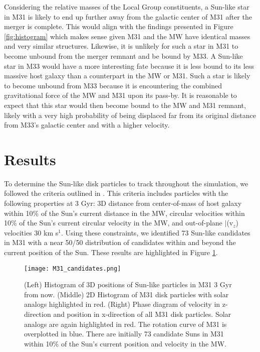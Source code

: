 \documentclass{aastex63}
\begin{document}
Considering the relative masses of the Local Group constituents, a Sun-like star in M31 is likely to end up further away from the galactic center of M31 after the merger is complete. This would align with the findings presented in Figure \ref{fig:histogram} which makes sense given M31 and the MW have identical masses and very similar structures. Likewise, it is unlikely for such a star in M31 to become unbound from the merger remnant and be bound by M33. A Sun-like star in M33 would have a more interesting fate because it is less bound to its less massive host galaxy than a counterpart in the MW or M31. Such a star is likely to become unbound from M33 because it is encountering the combined gravitational force of the MW and M31 upon its pass-by. It is reasonable to expect that this star would then become bound to the MW and M31 remnant, likely with a very high probability of being displaced far from its original distance from M33's galactic center and with a higher velocity.

\section{Results}
To determine the Sun-like disk particles to track throughout the simulation, we followed the criteria outlined in \cite{2012ApJ...753....8V}. This criteria includes particles with the following properties at 3 Gyr: 3D distance from center-of-mass of host galaxy within 10\% of the Sun's current distance in the MW, circular velocities within 10\% of the Sun's current circular velocity in the MW, and out-of-plane $\mid$(v$_z$\mid) velocities {30} km s$^1$. Using these constraints, we identified 73 Sun-like candidates in M31 with a near 50/50 distribution of candidates within and beyond the current position of the Sun. These results are highlighted in Figure \ref{fig:MyPlot1}.

\begin{figure}[h!]
    \centering
    \texttt{[image: M31\_candidates.png]}
    \caption{(Left) Histogram of 3D positions of Sun-like particles in M31 3 Gyr from now. (Middle) 2D Histogram of M31 disk particles with solar analogs highlighted in red. (Right) Phase diagram of velocity in z-direction and position in x-direction of all M31 disk particles. Solar analogs are again highlighted in red. The rotation curve of M31 is overplotted in blue. There are initially 73 candidate Suns in M31 within 10\% of the Sun's current position and velocity in the MW.}
    \label{fig:MyPlot1}
\end{figure}
\end{document}
